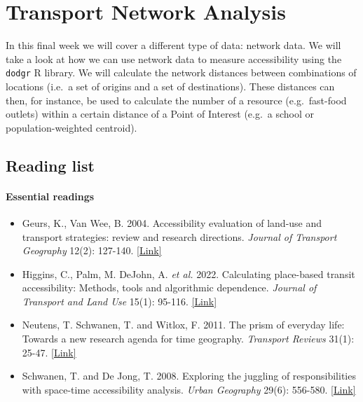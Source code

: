 \documentclass[
]{book}
\providecommand{\tightlist}{%
  \setlength{\itemsep}{0pt}\setlength{\parskip}{0pt}}
\begin{document}
\hypertarget{transport-network-analysis}{%
\chapter{Transport Network Analysis}\label{transport-network-analysis}}

In this final week we will cover a different type of data: network data. We will take a look at how we can use network data to measure accessibility using the \texttt{dodgr} R library. We will calculate the network distances between combinations of locations (i.e.~a set of origins and a set of destinations). These distances can then, for instance, be used to calculate the number of a resource (e.g.~fast-food outlets) within a certain distance of a Point of Interest (e.g.~a school or population-weighted centroid).

\hypertarget{reading-w10}{%
\section{Reading list}\label{reading-w10}}

\hypertarget{essential-readings-9}{%
\subsubsection*{Essential readings}\label{essential-readings-9}}

\begin{itemize}
\tightlist
\item
  Geurs, K., Van Wee, B. 2004. Accessibility evaluation of land-use and transport strategies: review and research directions. \emph{Journal of Transport Geography} 12(2): 127-140. \href{https://doi.org/10.1016/j.jtrangeo.2003.10.005}{{[}Link{]}}
\item
  Higgins, C., Palm, M. DeJohn, A. \emph{et al.} 2022. Calculating place-based transit accessibility: Methods, tools and algorithmic dependence. \emph{Journal of Transport and Land Use} 15(1): 95-116. \href{https://doi.org/10.5198/jtlu.2022.2012}{{[}Link{]}}
\item
  Neutens, T. Schwanen, T. and Witlox, F. 2011. The prism of everyday life: Towards a new research agenda for time geography. \emph{Transport Reviews} 31(1): 25-47. \href{https://doi.org/10.1080/01441647.2010.484153}{{[}Link{]}}
\item
  Schwanen, T. and De Jong, T. 2008. Exploring the juggling of responsibilities with space-time accessibility analysis. \emph{Urban Geography} 29(6): 556-580. \href{https://doi.org/10.2747/0272-3638.29.6.556}{{[}Link{]}}
\end{itemize}
\end{document}
